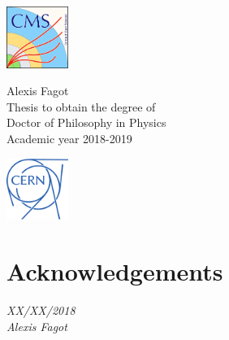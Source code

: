 \documentclass[10pt,a4paper,twoside,dutch,english,openright,leqno]{book}                %
\begin{document}
 \begin{minipage}{2.0cm}%
     \href{https://cms.cern/}{\includegraphics*[width=2.0cm]{CMS.pdf}}
 \end{minipage}\hfill
 \begin{minipage}{7cm}
 \centering
 \LARGE\textsf{Alexis Fagot\\}
 \vspace{5mm}
 \normalsize\textsf{Thesis to obtain the degree of\\
 Doctor of Philosophy in Physics\\
 Academic year 2018-2019}
 \end{minipage}\hfill
 \begin{minipage}{2.0cm}%
     \href{https://home.cern/}{\includegraphics*[width=2.0cm]{CERN.pdf}}
 \end{minipage}\hfill
\clearpage{\pagestyle{empty}\cleardoublepage}


\frontmatter
\chapter{Acknowledgements}
\vspace{0.35in}



\begin{flushright}{\emph{XX/XX/2018\\
Alexis Fagot}}
\end{flushright}

\clearpage{\pagestyle{empty}\cleardoublepage}


\renewcommand{\contentsname}{Table of Contents}
\tableofcontents

\renewcommand{\bibname}{References}
\end{document}
